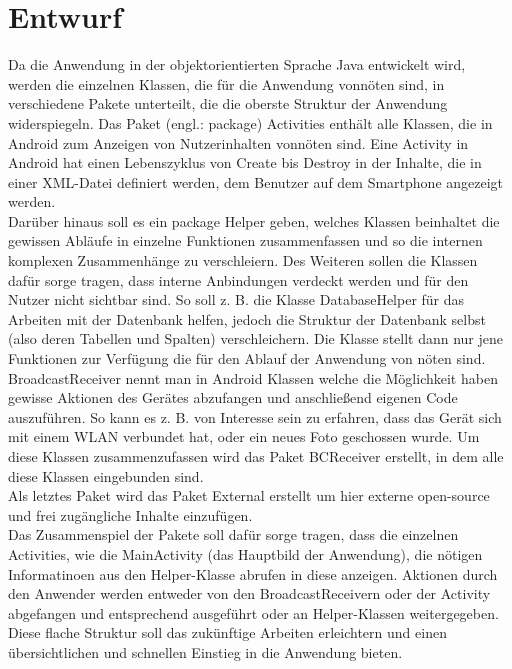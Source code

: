\documentclass[10pt, a4paper,headsepline]{scrreprt}
\begin{document}
\section{Entwurf}
Da die Anwendung in der objektorientierten Sprache Java entwickelt wird, werden die einzelnen Klassen, die für die Anwendung vonnöten sind, in verschiedene Pakete unterteilt, die die oberste Struktur der Anwendung widerspiegeln. Das Paket (engl.: package)  Activities enthält alle Klassen, die in Android zum Anzeigen von Nutzerinhalten vonnöten sind. Eine Activity in Android hat einen Lebenszyklus von Create bis Destroy in der Inhalte, die in einer XML-Datei definiert werden, dem Benutzer auf dem Smartphone angezeigt werden. \\
Darüber hinaus soll es ein package Helper geben, welches Klassen beinhaltet die gewissen Abläufe in einzelne Funktionen zusammenfassen und so die internen komplexen Zusammenhänge zu verschleiern. Des Weiteren sollen die Klassen dafür sorge tragen, dass interne Anbindungen verdeckt werden und für den Nutzer nicht sichtbar sind. So soll z. B. die Klasse DatabaseHelper für das Arbeiten mit der Datenbank helfen, jedoch die Struktur der Datenbank selbst (also deren Tabellen und Spalten) verschleichern. Die Klasse stellt dann nur jene Funktionen zur Verfügung die für den Ablauf der Anwendung von nöten sind. \\
BroadcastReceiver nennt man in Android Klassen welche die Möglichkeit haben gewisse Aktionen des Gerätes abzufangen und anschließend eigenen Code auszuführen. So kann es z. B. von Interesse sein zu erfahren, dass das Gerät sich mit einem WLAN verbundet hat, oder ein neues Foto geschossen wurde. Um diese Klassen zusammenzufassen wird das Paket BCReceiver erstellt, in dem alle diese Klassen eingebunden sind. \\
Als letztes Paket wird das Paket External erstellt um hier externe open-source und frei zugängliche Inhalte einzufügen. \\
Das Zusammenspiel der Pakete soll dafür sorge tragen, dass die einzelnen Activities, wie die MainActivity (das Hauptbild der Anwendung), die nötigen Informatinoen aus den Helper-Klasse abrufen in diese anzeigen. Aktionen durch den Anwender werden entweder von den BroadcastReceivern oder der Activity abgefangen und entsprechend ausgeführt oder an Helper-Klassen weitergegeben.  Diese flache Struktur soll das zukünftige Arbeiten erleichtern und einen übersichtlichen und schnellen Einstieg in die Anwendung bieten. \\ \\
\end{document}
